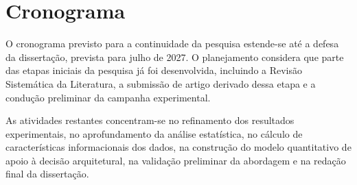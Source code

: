 \chapter{Cronograma}
\label{cap:cronograma}

O cronograma previsto para a continuidade da pesquisa estende-se até a defesa da dissertação, prevista para julho de 2027. O planejamento considera que parte das etapas iniciais da pesquisa já foi desenvolvida, incluindo a Revisão Sistemática da Literatura, a submissão de artigo derivado dessa etapa e a condução preliminar da campanha experimental.

As atividades restantes concentram-se no refinamento dos resultados experimentais, no aprofundamento da análise estatística, no cálculo de características informacionais dos dados, na construção do modelo quantitativo de apoio à decisão arquitetural, na validação preliminar da abordagem e na redação final da dissertação.



